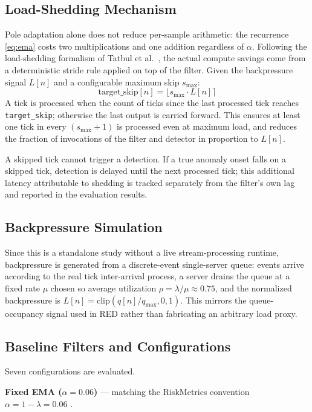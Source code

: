 \documentclass[conference]{IEEEtran}
\begin{document}
\subsection{Load-Shedding Mechanism}
Pole adaptation alone does not reduce per-sample arithmetic: the recurrence
\eqref{eq:ema} costs two multiplications and one addition regardless of
$\alpha$. Following the load-shedding formalism of Tatbul et al.\ \cite{loadsheddingtatbul},
the actual compute savings come from a deterministic stride rule applied on
top of the filter. Given the backpressure signal $L[n]$ and a configurable
maximum skip $s_\text{max}$:
\begin{equation}
\text{target\_skip}[n] = \lfloor s_\text{max}\cdot L[n] \rceil
\end{equation}
A tick is processed when the count of ticks since the last processed tick
reaches \texttt{target\_skip}; otherwise the last output is carried forward.
This ensures at least one tick in every $(s_\text{max}+1)$ is processed even
at maximum load, and reduces the fraction of invocations of the filter and
detector in proportion to $L[n]$.

A skipped tick cannot trigger a detection. If a true anomaly onset falls on
a skipped tick, detection is delayed until the next processed tick; this
additional latency attributable to shedding is tracked separately from the
filter's own lag and reported in the evaluation results.

\subsection{Backpressure Simulation}
Since this is a standalone study without a live stream-processing runtime,
backpressure is generated from a discrete-event single-server queue: events
arrive according to the real tick inter-arrival process, a server drains the
queue at a fixed rate $\mu$ chosen so average utilization $\rho=\lambda/\mu
\approx 0.75$, and the normalized backpressure is
$L[n] = \text{clip}(q[n]/q_\text{max}, 0, 1)$. This mirrors the
queue-occupancy signal used in RED \cite{red} rather than fabricating an
arbitrary load proxy.

\subsection{Baseline Filters and Configurations}
Seven configurations are evaluated.

\smallskip
\noindent\textbf{Fixed EMA ($\alpha=0.06$)} — matching the RiskMetrics
convention $\alpha=1-\lambda=0.06$ \cite{riskmetrics}.
\end{document}
